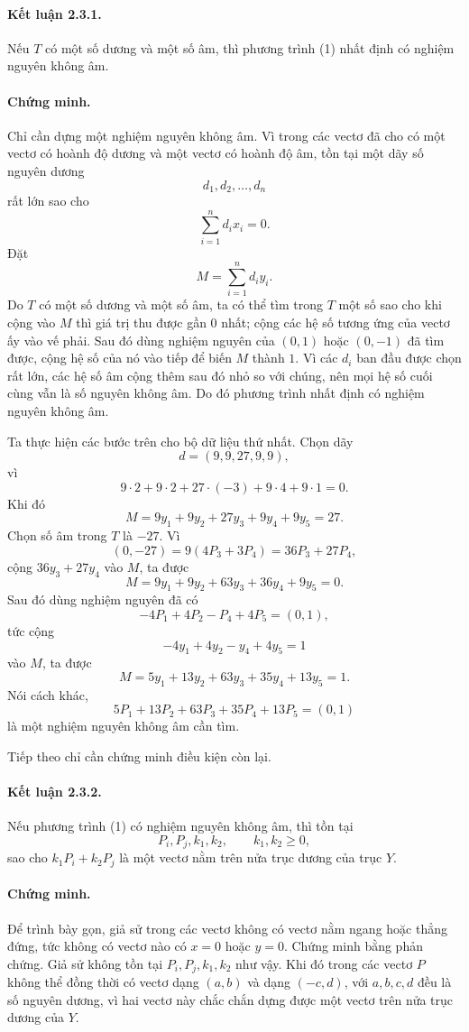 \documentclass[11pt]{article}
\begin{document}
\paragraph{Kết luận 2.3.1.}
Nếu \(T\) có một số dương và một số âm, thì phương trình (1) nhất định có
nghiệm nguyên không âm.

\paragraph{Chứng minh.}
Chỉ cần dựng một nghiệm nguyên không âm. Vì trong các vectơ đã cho có một
vectơ có hoành độ dương và một vectơ có hoành độ âm, tồn tại một dãy số nguyên
dương
\[
  d_1,d_2,\ldots,d_n
\]
rất lớn sao cho
\[
  \sum_{i=1}^{n}d_ix_i=0.
\]
Đặt
\[
  M=\sum_{i=1}^{n}d_iy_i.
\]
Do \(T\) có một số dương và một số âm, ta có thể tìm trong \(T\) một số sao
cho khi cộng vào \(M\) thì giá trị thu được gần \(0\) nhất; cộng các hệ số
tương ứng của vectơ ấy vào vế phải. Sau đó dùng nghiệm nguyên của \((0,1)\)
hoặc \((0,-1)\) đã tìm được, cộng hệ số của nó vào tiếp để biến \(M\) thành
\(1\). Vì các \(d_i\) ban đầu được chọn rất lớn, các hệ số âm cộng thêm sau
đó nhỏ so với chúng, nên mọi hệ số cuối cùng vẫn là số nguyên không âm. Do đó
phương trình nhất định có nghiệm nguyên không âm.

Ta thực hiện các bước trên cho bộ dữ liệu thứ nhất. Chọn dãy
\[
  d=(9,9,27,9,9),
\]
vì
\[
  9\cdot2+9\cdot2+27\cdot(-3)+9\cdot4+9\cdot1=0.
\]
Khi đó
\[
  M=9y_1+9y_2+27y_3+9y_4+9y_5=27.
\]
Chọn số âm trong \(T\) là \(-27\). Vì
\[
  (0,-27)=9(4P_3+3P_4)=36P_3+27P_4,
\]
cộng \(36y_3+27y_4\) vào \(M\), ta được
\[
  M=9y_1+9y_2+63y_3+36y_4+9y_5=0.
\]
Sau đó dùng nghiệm nguyên đã có
\[
  -4P_1+4P_2-P_4+4P_5=(0,1),
\]
tức cộng
\[
  -4y_1+4y_2-y_4+4y_5=1
\]
vào \(M\), ta được
\[
  M=5y_1+13y_2+63y_3+35y_4+13y_5=1.
\]
Nói cách khác,
\[
  5P_1+13P_2+63P_3+35P_4+13P_5=(0,1)
\]
là một nghiệm nguyên không âm cần tìm.

Tiếp theo chỉ cần chứng minh điều kiện còn lại.

\paragraph{Kết luận 2.3.2.}
Nếu phương trình (1) có nghiệm nguyên không âm, thì tồn tại
\[
  P_i,P_j,k_1,k_2,\qquad k_1,k_2\ge 0,
\]
sao cho \(k_1P_i+k_2P_j\) là một vectơ nằm trên nửa trục dương của trục
\(Y\).

\paragraph{Chứng minh.}
Để trình bày gọn, giả sử trong các vectơ không có vectơ nằm ngang hoặc thẳng
đứng, tức không có vectơ nào có \(x=0\) hoặc \(y=0\). Chứng minh bằng phản
chứng. Giả sử không tồn tại \(P_i,P_j,k_1,k_2\) như vậy. Khi đó trong các
vectơ \(P\) không thể đồng thời có vectơ dạng \((a,b)\) và dạng \((-c,d)\),
với \(a,b,c,d\) đều là số nguyên dương, vì hai vectơ này chắc chắn dựng được
một vectơ trên nửa trục dương của \(Y\).
\end{document}
